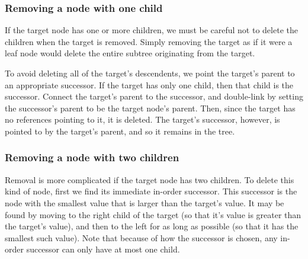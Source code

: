 \subsubsection*{Removing a node with one child}

If the target node has one or more children, we must be careful not to delete the children when the target is removed.
Simply removing the target as if it were a leaf node would delete the entire subtree originating from the target.

To avoid deleting all of the target's descendents, we point the target's parent to an appropriate successor.
If the target has only one child, then that child is the successor.
Connect the target's parent to the successor, and double-link by setting the successor's parent to be the target node's parent.
Then, since the target has no references pointing to it, it is deleted.
The target's successor, however, is pointed to by the target's parent, and so it remains in the tree.

\subsubsection*{Removing a node with two children}

Removal is more complicated if the target node has two children.
To delete this kind of node, first we find its immediate in-order successor.
This successor is the node with the smallest value that is larger than the target's value.
It may be found by moving to the right child of the target (so that it's value is greater than the target's value), and then to the left for as long as possible (so that it has the smallest such value).
Note that because of how the successor is chosen, any in-order successor can only have at most one child.

